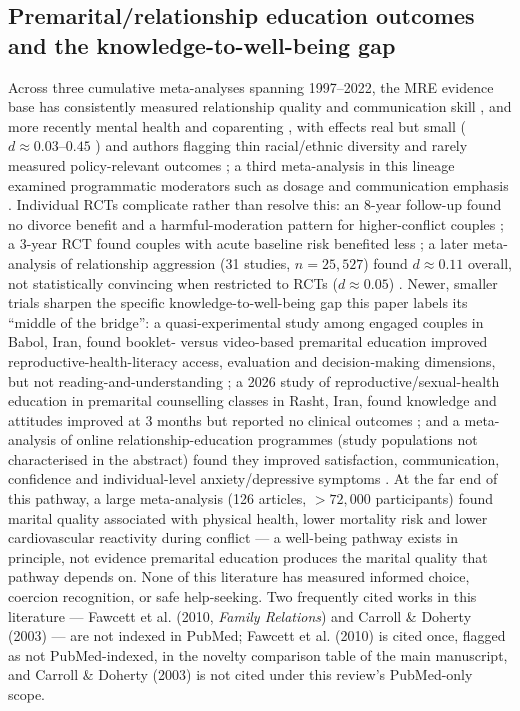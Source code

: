 \documentclass[11pt]{article}
\begin{document}
\subsection{Premarital/relationship education outcomes and the knowledge-to-well-being gap}
Across three cumulative meta-analyses spanning 1997--2022, the MRE evidence base has consistently measured relationship quality and communication skill \cite{ref6,ref33}, and more recently mental health and coparenting \cite{ref7}, with effects real but small ($d\approx 0.03$--$0.45$ \cite{ref6,ref7}) and authors flagging thin racial/ethnic diversity \cite{ref6} and rarely measured policy-relevant outcomes \cite{ref7}; a third meta-analysis in this lineage examined programmatic moderators such as dosage and communication emphasis \cite{ref33}. Individual RCTs complicate rather than resolve this: an 8-year follow-up found no divorce benefit and a harmful-moderation pattern for higher-conflict couples \cite{ref9}; a 3-year RCT found couples with acute baseline risk benefited less \cite{ref10}; a later meta-analysis of relationship aggression (31 studies, $n=25{,}527$) found $d\approx 0.11$ overall, not statistically convincing when restricted to RCTs ($d\approx 0.05$) \cite{ref8}. Newer, smaller trials sharpen the specific knowledge-to-well-being gap this paper labels its ``middle of the bridge'': a quasi-experimental study among engaged couples in Babol, Iran, found booklet- versus video-based premarital education improved reproductive-health-literacy access, evaluation and decision-making dimensions, but not reading-and-understanding \cite{ref34}; a 2026 study of reproductive/sexual-health education in premarital counselling classes in Rasht, Iran, found knowledge and attitudes improved at 3 months but reported no clinical outcomes \cite{ref35}; and a meta-analysis of online relationship-education programmes (study populations not characterised in the abstract) found they improved satisfaction, communication, confidence and individual-level anxiety/depressive symptoms \cite{ref36}. At the far end of this pathway, a large meta-analysis (126 articles, $>72{,}000$ participants) found marital quality associated with physical health, lower mortality risk and lower cardiovascular reactivity during conflict \cite{ref37} --- a well-being pathway exists in principle, not evidence premarital education produces the marital quality that pathway depends on. None of this literature has measured informed choice, coercion recognition, or safe help-seeking. Two frequently cited works in this literature --- Fawcett et al. (2010, \emph{Family Relations}) and Carroll \& Doherty (2003) --- are not indexed in PubMed; Fawcett et al. (2010) is cited once, flagged as not PubMed-indexed, in the novelty comparison table of the main manuscript, and Carroll \& Doherty (2003) is not cited under this review's PubMed-only scope.
\end{document}
